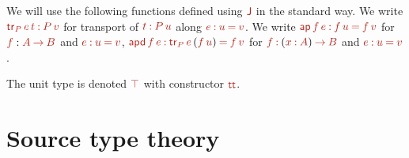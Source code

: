 \documentclass[a4paper,UKenglish]{lipics-v2018}
\newcommand{\ra}{\rightarrow}
\newcommand{\1}{\mathsf{1}} \renewcommand{\Pr}{\mathsf{Pr}}
\renewcommand{\in}{\mathbin{\hat:}}
\renewcommand{\hat}[1]{{\color{BrickRed}{#1}}}
\newcommand{\rah}{\mathbin{\hat\ra}}
\newcommand{\eqh}{\mathbin{\hat=}}
\newcommand{\TR}{\hat{\mathsf{tr}}}
\newcommand{\ap}{\hat{\mathsf{ap}}}
\newcommand{\apd}{\hat{\mathsf{apd}}}
\renewcommand{\tt}{\hat{\mathsf{tt}}}
\begin{document}
We will use the following functions defined using $\hat{\J}$ in the
standard way. We write $\TR_{\hat{P}}\,\hat{e}\,\hat{t}\in
\hat{P}\,\hat{v}$ for transport of $\hat{t} \in \hat{P}\,\hat{u}$
along $\hat{e} \in \hat{u}\eqh \hat{v}$. We write
$\ap\,\hat{f}\,\hat{e}\in\hat{f}\,\hat{u}\eqh\hat{f}\,\hat{v}$ for
$\hat{f}:\hat{A}\rah\hat{B}$ and $\hat{e}\in\hat{u}\eqh\hat{v}$,
$\apd\,\hat{f}\,\hat{e} \in \TR_{\hat{P}}\,\hat{e}\,(\hat{f}\,\hat{u})
\eqh \hat{f}\,\hat{v}$ for $\hat{f}\in(\hat{x}\in \hat{A})\rah
\hat{B}$ and $\hat{e} \in \hat{u}\eqh \hat{v}$.

The unit type is denoted $\hat{\top}$ with constructor $\tt$.


\section{Source type theory}
\label{sec:source}
\end{document}
